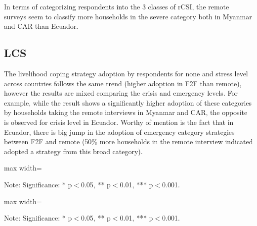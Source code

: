 \documentclass[11pt,harvard]{article}
\begin{document}
In terms of categorizing respondents into the 3 classes of rCSI, the remote surveys seem to classify more households in the severe category both in Myanmar and CAR than Ecuador.

	\pagebreak

\subsection{LCS}

The livelihood coping strategy adoption by respondents for none and stress level across countries follows the same trend (higher adoption in F2F than remote), however the results are mixed comparing the crisis and emergency levels. For example, while the result shows a significantly higher adoption of these categories by households taking the remote interviews in Myanmar and CAR, the opposite is observed for crisis level in Ecuador. Worthy of mention is the fact that in Ecuador, there is big jump in the adoption of emergency category strategies between F2F and remote (50\% more households in the remote interview indicated adopted a strategy from this broad category). 

\begin{table}[htbp]
	\centering
	\begin{adjustbox}{max width=\textwidth}
		\begin{threeparttable}
			\caption{Impact of Survey Modality on Livelihood Coping Strategy Index}
			\scriptsize
			 
			\label{tab:LCS_Modality_All_Country}
			\begin{tablenotes}
				\item Note: Significance: * p$<$0.05, ** p$<$0.01, *** p$<$0.001. 
			\end{tablenotes}
		\end{threeparttable}
	\end{adjustbox}
\end{table}

\begin{table}[htbp]
	\centering
	\begin{adjustbox}{max width=\textwidth}
		\begin{threeparttable}
			\caption{Myanmar: Each Coping Strategy Used}
			\scriptsize
			 
			\label{tab:LCS_Ind_Modality_Myanmar}
			\begin{tablenotes}
				\item Note: Significance: * p$<$0.05, ** p$<$0.01, *** p$<$0.001. 
			\end{tablenotes}
		\end{threeparttable}
	\end{adjustbox}
\end{table}
\end{document}
